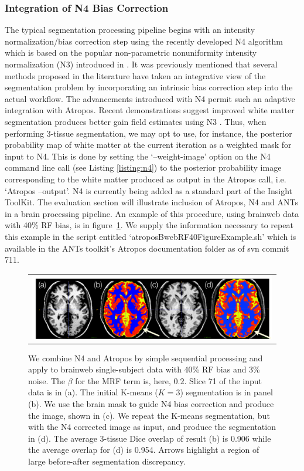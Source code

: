 \documentclass[11pt,english]{article}
\begin{document}
\subsubsection{Integration of N4 Bias Correction}
The typical segmentation processing pipeline begins with an intensity
normalization/bias correction step using the recently developed N4
algorithm \citep{Tustison2010} which is based on the popular
non-parametric nonuniformity intensity normalization (N3) introduced in \cite{Sled1998}.  It was previously mentioned that
several methods proposed in the literature have taken an integrative
view of the segmentation problem by incorporating an intrinsic bias
correction step into the actual workflow.  The
advancements introduced with N4 permit such an adaptive
integration with Atropos.  Recent demonstrations suggest improved
white matter segmentation produces better gain field estimates using
N3 \citep{Boyes2008}.  Thus, when performing 3-tissue segmentation, we
may opt to use, for instance, the posterior probability map of white matter at the current
iteration as a weighted mask for input to N4.  This is done by setting
the `{\ttfamily --weight-image}' option on the N4 command line call
(see Listing \ref{listing:n4}) to the posterior probability image
corresponding to the white matter produced as output in the Atropos
call, i.e. `{\ttfamily Atropos --output}'.  N4 is
currently being added as a standard part of the Insight ToolKit.  The
evaluation section will illustrate inclusion of Atropos, N4 and ANTs
in a brain processing pipeline.  An example of this procedure, using brainweb data with
40\% RF bias, is in figure~\ref{fig:bwebrf40}.  We supply the
information necessary to repeat this example in the script entitled
`{\ttfamily  atroposBwebRF40FigureExample.sh}' which is available in the ANTs toolkit's Atropos
documentation folder as of svn commit 711.
\begin{figure}
\begin{center}
\begin{tabular}{c}
\includegraphics[width=6in]{Figures/bwebN4ex.pdf}
\end{tabular}
\caption{\baselineskip 12pt \small We combine N4 and Atropos by simple
sequential processing and apply to brainweb single-subject data with
40\% RF bias and 3\% noise.  The $\beta$ for the MRF term is, here,
$0.2$.  Slice 71 of the input data is in (a).  The initial K-means
($K=3$) segmentation is in panel (b).  We use the brain mask to guide
N4 bias correction and produce the image, shown in (c).  We repeat the
K-means segmentation, but with the N4 corrected image as input, and
produce the segmentation in (d).  The average 3-tissue Dice overlap of
result (b) is 0.906 while the average overlap for (d) is 0.954.
Arrows highlight a region of large before-after segmentation
discrepancy.}
\label{fig:bwebrf40}
\end{center}
\end{figure}
\end{document}
